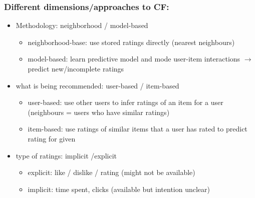 \subsubsection{Different dimensions/approaches to CF:}
\begin{itemize}
    \item Methodology: neighborhood / model-based
    \begin{itemize}
        \item neighborhood-base: use stored ratings directly (nearest neighbours)
        \item model-based: learn predictive model and mode user-item interactions $\rightarrow$ predict new/incomplete ratings
    \end{itemize}
    \item what is being recommended: user-based / item-based
    \begin{itemize}
        \item user-based: use other users to infer ratings of an item for a user (neighbours = users who have similar ratings)
        \item item-based: use ratings of similar items that a user has rated to predict rating for given 
    \end{itemize}
    \item type of ratings: implicit /explicit
    \begin{itemize}
        \item explicit: like / dislike / rating (might not be available)
        \item implicit: time spent, clicks (available but intention unclear)
    \end{itemize}
\end{itemize}
